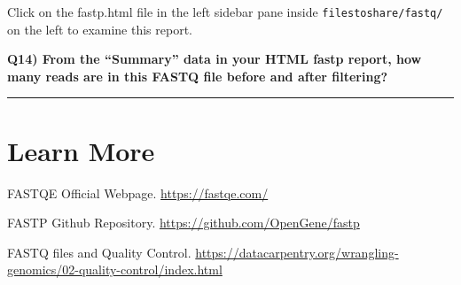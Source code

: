 \documentclass[
]{article}
\begin{document}
Click on the fastp.html file in the left sidebar pane inside
\texttt{filestoshare/fastq/} on the left to examine this report.

\textbf{Q14) From the ``Summary'' data in your HTML fastp report, how
many reads are in this FASTQ file before and after filtering?}

\begin{center}\rule{0.5\linewidth}{0.5pt}\end{center}

\hypertarget{learn-more}{%
\section{Learn More}\label{learn-more}}

FASTQE Official Webpage. \url{https://fastqe.com/}

FASTP Github Repository. \url{https://github.com/OpenGene/fastp}

FASTQ files and Quality Control.
\url{https://datacarpentry.org/wrangling-genomics/02-quality-control/index.html}
\end{document}
